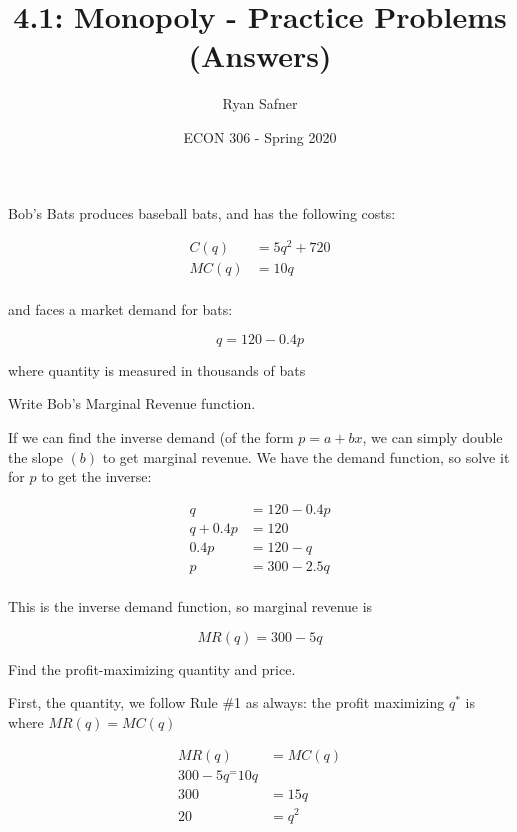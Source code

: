 \documentclass[12 pt]{exam}
\title{4.1: Monopoly - Practice Problems (Answers)}
\author{Ryan Safner}
\date{ECON 306 - Spring 2020}
\begin{document}
\maketitle

Bob's Bats produces baseball bats, and has the following costs:

\begin{align*}
C(q)&=5q^2+720\\
MC(q)&=10q\\	
\end{align*}

and faces a market demand for bats:

$$q = 120-0.4p$$

where quantity is measured in thousands of bats

\begin{questions}

\question Write Bob's Marginal Revenue function.

\begin{solution}

If we can find the inverse demand (of the form $p=a+bx$, we can simply double the slope $(b)$ to get marginal revenue. We have the demand function, so solve it for $p$ to get the inverse:

\begin{align*}
q &= 120-0.4p\\
q+0.4p&=120\\
0.4p&=120-q\\
p&=300-2.5q\\
\end{align*}

This is the inverse demand function, so marginal revenue is 

$$MR(q)=300-5q$$

\end{solution}

\question Find the profit-maximizing quantity and price.

\begin{solution}

First, the quantity, we follow Rule \#1 as always: the profit maximizing $q^*$ is where $MR(q)=MC(q)$

\begin{align*}
	MR(q)&= MC(q)\\
	300-5q^=10q\\
	300&=15q\\
	20&=q^2\\
\end{align*}


\end{solution}
\end{questions}
\end{document}
